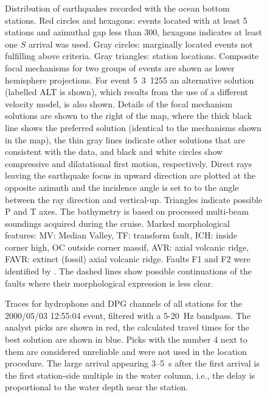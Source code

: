 \documentclass[jgr]{agu2001}
\newlength{\tw}
\begin{document}
\clearpage

\begin{figure}

\caption{Distribution of earthquakes recorded with the ocean bottom
stations.  Red circles and hexagons: events located with at least 5 stations and
azimuthal gap less than 300\dg, hexagons indicates at least one $S$
arrival was used. Gray circles: marginally located events not fulfilling above
criteria. Gray triangles: station locations.  Composite focal mechanisms for two
groups of events are shown as lower hemisphere projections.  
  For
event 5~3~1255 an alternative solution (labelled ALT is shown), which results from
the use of a different velocity model, is also shown.  Details of the focal
mechanism solutions are shown to the right of the map, where the thick
black line shows the preferred solution (identical to the
mechanisms shown in the map), the thin gray lines indicate other
solutions that are consistent with the data, and black and white circles show
compressive and dilatational first motion, respectively. Direct rays
leaving the earthquake focus in upward direction are plotted at the
opposite azimuth and the incidence angle is set to to the angle
between the ray direction and vertical-up.  Triangles indicate possible P and T axes.  The bathymetry is
based on processed multi-beam soundings acquired during the cruise.
Marked morphological features: MV: Median Valley, TF: transform fault,
ICH: inside corner high, OC outside corner massif, AVR: axial volcanic
ridge, FAVR: extinct (fossil) axial volcanic ridge. Faults F1 and F2 were identified by \citep{reston02}.  
The dashed lines show possible continuations of the faults where their morphological expression is 
less clear.}
\label{fig:seismag-map}
\end{figure}

\clearpage

\begin{figure}
\caption{Traces for hydrophone and DPG channels of all stations for the
2000/05/03 12:55:04 event, filtered with a 5-20~Hz bandpass.  The
analyst picks are shown in red, the calculated travel times for the
best solution are shown in blue.  Picks with the number 4 next to them
are considered unreliable and were not used in the location
procedure.  The large arrival appearing 3--5~s after the first arrival
is the first station-side multiple in the water column, i.e., the
delay is proportional to the water depth near the station.}
\label{fig:data-example}
\end{figure}
\end{document}
